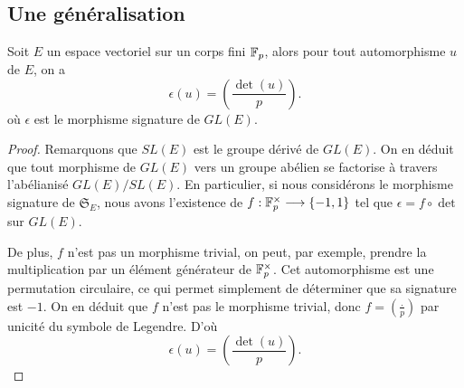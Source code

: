 \documentclass[../main.tex]{subfiles}
\begin{document}
\subsection*{Une généralisation}
\begin{theorem} Soit \(E\) un espace vectoriel sur un corps fini \(\mathbb{F}_p\), alors pour tout
    automorphisme \(u\) de \(E\), on a
    \begin{equation}
        \epsilon(u) = \left(\frac{\det(u)}{p}\right).
    \end{equation}
    où \(\epsilon\) est le morphisme signature de \(GL(E)\).
\end{theorem}
\begin{proof} Remarquons que \(SL(E)\) est le groupe dérivé de \(GL(E)\). On en déduit que
    tout morphisme de \(GL(E)\) vers un groupe abélien se factorise à travers l'abélianisé \(GL(E)/SL(E)\).
    En particulier, si nous considérons le morphisme signature de \(\mathfrak{S}_E\), nous avons l'existence
    de \(f : \mathbb{F}_p^\times \longrightarrow \{-1,1\}\) tel que \(\epsilon = f\circ \det\) sur \(GL(E)\).

    De plus, \(f\) n'est pas un morphisme trivial, on peut, par exemple, prendre la multiplication par
    un élément générateur de \(\mathbb{F}_p^\times\). Cet automorphisme est une permutation circulaire, ce qui permet simplement de déterminer que sa signature est \(-1\).
    On en déduit que \(f\) n'est pas le morphisme trivial, donc \(f = \left(\frac{.}{p}\right)\) par unicité du symbole de Legendre.
    D'où 
    \begin{equation}
        \epsilon(u) = \left(\frac{\det(u)}{p}\right).
    \end{equation}
\end{proof}
\end{document}
